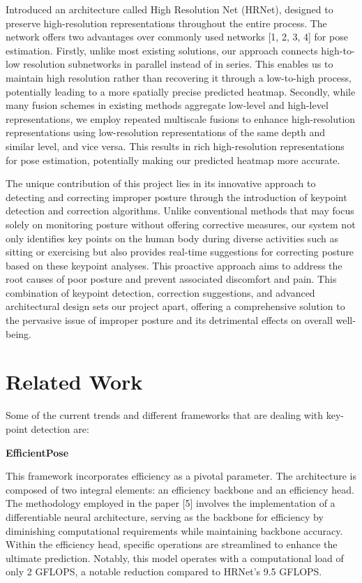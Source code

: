 \documentclass{article}
\begin{document}
Introduced an architecture called High Resolution Net (HRNet), designed to preserve high-resolution representations throughout the entire process. The network offers two advantages over commonly used networks [1, 2, 3, 4] for pose estimation. Firstly, unlike most existing solutions, our approach connects high-to-low resolution subnetworks in parallel instead of in series. This enables us to maintain high resolution rather than recovering it through a low-to-high process, potentially leading to a more spatially precise predicted heatmap. Secondly, while many fusion schemes in existing methods aggregate low-level and high-level representations, we employ repeated multiscale fusions to enhance high-resolution representations using low-resolution representations of the same depth and similar level, and vice versa. This results in rich high-resolution representations for pose estimation, potentially making our predicted heatmap more accurate.

The unique contribution of this project lies in its innovative approach to detecting and correcting improper posture through the introduction of keypoint detection and correction algorithms. Unlike conventional methods that may focus solely on monitoring posture without offering corrective measures, our system not only identifies key points on the human body during diverse activities such as sitting or exercising but also provides real-time suggestions for correcting posture based on these keypoint analyses. This proactive approach aims to address the root causes of poor posture and prevent associated discomfort and pain. This combination of keypoint detection, correction suggestions, and advanced architectural design sets our project apart, offering a comprehensive solution to the pervasive issue of improper posture and its detrimental effects on overall well-being.


\section{\fontsize{12}{14}\selectfont Related Work}
Some of the current trends and different frameworks that are dealing with key-point detection are:

\textbf{EfficientPose}

This framework incorporates efficiency as a pivotal parameter. The architecture is composed of two integral elements: an efficiency backbone and an efficiency head. The methodology employed in the paper [5] involves the implementation of a differentiable neural architecture, serving as the backbone for efficiency by diminishing computational requirements while maintaining backbone accuracy. Within the efficiency head, specific operations are streamlined to enhance the ultimate prediction. Notably, this model operates with a computational load of only 2 GFLOPS, a notable reduction compared to HRNet's 9.5 GFLOPS.
\end{document}
